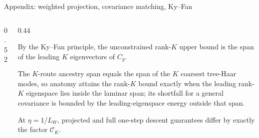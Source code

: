 \begin{frame}{Appendix: weighted projection, covariance matching, Ky--Fan}
  \begin{columns}[T,onlytextwidth]
    \begin{column}{0.52\textwidth}
    \end{column}
    \begin{column}{0.44\textwidth}
      {\footnotesize By the Ky--Fan principle, the unconstrained rank-$K$
       upper bound is the span of the leading $K$ eigenvectors of $C_g$.\par
       \vspace{0.10cm}
       The $K$-route ancestry span equals the span of the $K$ coarsest
       tree-Haar modes, so anatomy attains the rank-$K$ bound exactly when the
       leading rank-$K$ eigenspace lies inside the laminar span; its shortfall
       for a general covariance is bounded by the leading-eigenspace energy
       outside that span.\par
       \vspace{0.10cm}
       At $\eta=1/L_W$, projected and full one-step descent guarantees differ
       by exactly the factor $\mathcal C_K$.\par}
    \end{column}
  \end{columns}
  \vfill
  \vspace{0.04cm}
\end{frame}

